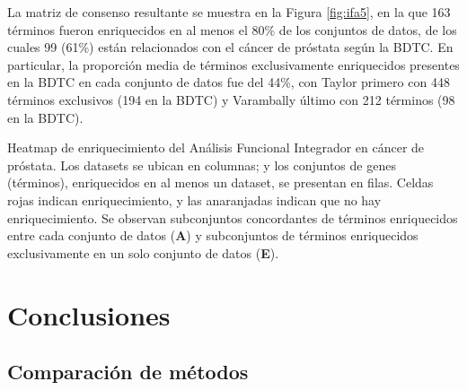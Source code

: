 \documentclass[12pt,twoside]{reedthesis}
\begin{document}
\par

La matriz de consenso resultante se muestra en la Figura \ref{fig:ifa5}, en la que 163 términos fueron enriquecidos en al menos el 80\% de los conjuntos de datos, de los cuales 99 (61\%) están relacionados con el cáncer de próstata según la BDTC. En particular, la proporción media de términos exclusivamente enriquecidos presentes en la BDTC en cada conjunto de datos fue del 44\%, con Taylor primero con 448 términos exclusivos (194 en la BDTC) y Varambally último con 212 términos (98 en la BDTC).

\newpage

Heatmap de enriquecimiento del Análisis Funcional Integrador en cáncer de próstata. Los datasets se ubican en columnas; y los conjuntos de genes (términos), enriquecidos en al menos un dataset, se presentan en filas. Celdas rojas indican enriquecimiento, y las anaranjadas indican que no hay enriquecimiento. Se observan subconjuntos concordantes de términos enriquecidos entre cada conjunto de datos (\textbf{A}) y subconjuntos de términos enriquecidos exclusivamente en un solo conjunto de datos (\textbf{E}).



\hypertarget{conclusiones}{%
\section{Conclusiones}\label{conclusiones}}

\hypertarget{comparaciuxf3n-de-muxe9todos}{%
\subsection{Comparación de métodos}\label{comparaciuxf3n-de-muxe9todos}}

\par
\end{document}
